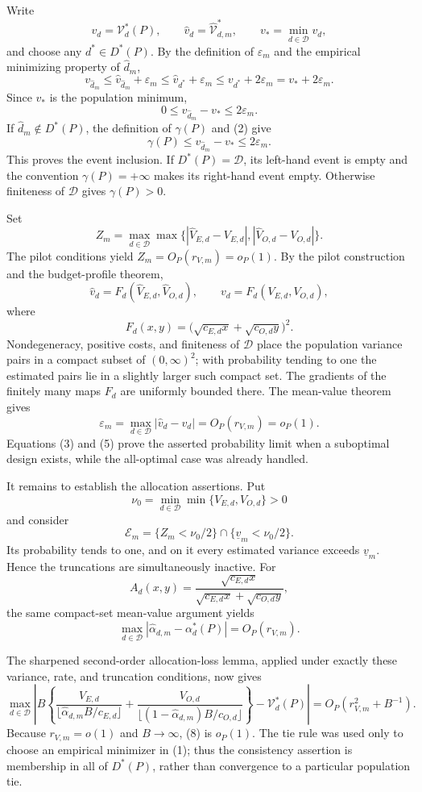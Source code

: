 Write
\[
 v_d=\mathcal V_d^*(P),\qquad
 \widehat v_d=\widehat{\mathcal V}_{d,m}^*,\qquad
 v_* =\min_{d\in\mathcal D}v_d,
\]
and choose any \(d^*\in D^*(P)\).  By the definition of \(\varepsilon_m\) and the empirical minimizing property of \(\widehat d_m\),
\[
 v_{\widehat d_m}
 \le \widehat v_{\widehat d_m}+\varepsilon_m
 \le \widehat v_{d^*}+\varepsilon_m
 \le v_{d^*}+2\varepsilon_m
 =v_*+2\varepsilon_m.
 \tag{1}
\]
Since \(v_*\) is the population minimum,
\[
 0\le v_{\widehat d_m}-v_*\le2\varepsilon_m.
 \tag{2}
\]
If \(\widehat d_m\notin D^*(P)\), the definition of \(\gamma(P)\) and (2) give
\[
 \gamma(P)\le v_{\widehat d_m}-v_*\le2\varepsilon_m.
 \tag{3}
\]
This proves the event inclusion.  If \(D^*(P)=\mathcal D\), its left-hand event is empty and the convention \(\gamma(P)=+\infty\) makes its right-hand event empty.  Otherwise finiteness of \(\mathcal D\) gives \(\gamma(P)>0\).

Set
\[
 Z_m=\max_{d\in\mathcal D}\max\bigl\{
 |\widehat V_{E,d}-V_{E,d}|,
 |\widehat V_{O,d}-V_{O,d}|\bigr\}.
\]
The pilot conditions yield \(Z_m=O_P(r_{V,m})=o_P(1)\).  By the pilot construction and the budget-profile theorem,
\[
 \widehat v_d=F_d(\widehat V_{E,d},\widehat V_{O,d}),
 \qquad
 v_d=F_d(V_{E,d},V_{O,d}),
 \tag{4}
\]
where
\[
 F_d(x,y)=\bigl(\sqrt{c_{E,d}x}+\sqrt{c_{O,d}y}\bigr)^2.
\]
Nondegeneracy, positive costs, and finiteness of \(\mathcal D\) place the population variance pairs in a compact subset of \((0,\infty)^2\); with probability tending to one the estimated pairs lie in a slightly larger such compact set.  The gradients of the finitely many maps \(F_d\) are uniformly bounded there.  The mean-value theorem gives
\[
 \varepsilon_m
 =\max_{d\in\mathcal D}|\widehat v_d-v_d|
 =O_P(r_{V,m})=o_P(1).
 \tag{5}
\]
Equations (3) and (5) prove the asserted probability limit when a suboptimal design exists, while the all-optimal case was already handled.

It remains to establish the allocation assertions.  Put
\[
 \nu_0=\min_{d\in\mathcal D}\min\{V_{E,d},V_{O,d}\}>0
\]
and consider
\[
 \mathcal E_m=\{Z_m<\nu_0/2\}\cap\{\underline v_m<\nu_0/2\}.
 \tag{6}
\]
Its probability tends to one, and on it every estimated variance exceeds \(\underline v_m\).  Hence the truncations are simultaneously inactive.  For
\[
 A_d(x,y)=
 \frac{\sqrt{c_{E,d}x}}
 {\sqrt{c_{E,d}x}+\sqrt{c_{O,d}y}},
\]
the same compact-set mean-value argument yields
\[
 \max_{d\in\mathcal D}
 |\widehat\alpha_{d,m}-\alpha_d^*(P)|=O_P(r_{V,m}).
 \tag{7}
\]

The sharpened second-order allocation-loss lemma, applied under exactly these variance, rate, and truncation conditions, now gives
\[
\max_{d\in\mathcal D}\left|B\left\{
\frac{V_{E,d}}{\lfloor\widehat\alpha_{d,m}B/c_{E,d}\rfloor}
+\frac{V_{O,d}}{\lfloor(1-\widehat\alpha_{d,m})B/c_{O,d}\rfloor}
\right\}-\mathcal V_d^*(P)\right|
=O_P(r_{V,m}^2+B^{-1}).
 \tag{8}
\]
Because \(r_{V,m}=o(1)\) and \(B\to\infty\), (8) is \(o_P(1)\).  The tie rule was used only to choose an empirical minimizer in (1); thus the consistency assertion is membership in all of \(D^*(P)\), rather than convergence to a particular population tie.